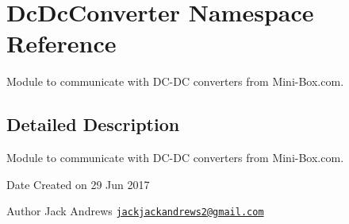 \hypertarget{namespace_dc_dc_converter}{}\section{Dc\+Dc\+Converter Namespace Reference}
\label{namespace_dc_dc_converter}


Module to communicate with D\+C-\/\+DC converters from Mini-\/\+Box.\+com.  




\subsection{Detailed Description}
Module to communicate with D\+C-\/\+DC converters from Mini-\/\+Box.\+com. 

\begin{DoxyDate}{Date}
Created on 29 Jun 2017
\end{DoxyDate}
\begin{DoxyAuthor}{Author}
Jack Andrews \href{mailto:jackjackandrews2@gmail.com}{\tt jackjackandrews2@gmail.\+com} 
\end{DoxyAuthor}
